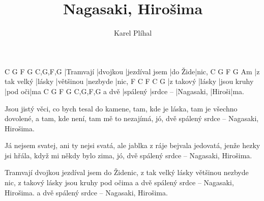 \documentclass{song}
\title{Nagasaki, Hirošima}
\author{Karel Plíhal}
\begin{document}
\strophe
C         G        F              G       C,G,F,G
|Tramvají |dvojkou |jezdíval jsem |do Žide|nic,
C            G      F         G        Am
|z tak velký |lásky |většinou |nezbyde |nic,
F         C      F           C       G
|z takový |lásky |jsou kruhy |pod oči|ma
      C        G         F          G      C,G,F,G
a dvě |spálený |srdce -- |Nagasaki, |Hiroši|ma.
\endstrophe

\strophe*
Jsou jistý věci, co bych tesal do kamene,
tam, kde je láska, tam je všechno dovolené,
a tam, kde není, tam mě to nezajímá,
jó, dvě spálený srdce -- Nagasaki, Hirošima.
\endstrophe

\strophe*
Já nejsem svatej, ani ty nejsi svatá,
ale jablka z ráje bejvala jedovatá,
jenže hezky jsi hřála, když mi někdy bylo zima,
jó, dvě spálený srdce -- Nagasaki, Hirošima.
\endstrophe

\strophe*
Tramvají dvojkou jezdíval jsem do Židenic,
z tak velký lásky většinou nezbyde nic,
z takový lásky jsou kruhy pod očima
a dvě spálený srdce -- Nagasaki, Hirošima.
a dvě spálený srdce -- Nagasaki, Hirošima.
\endstrophe
\end{document}

